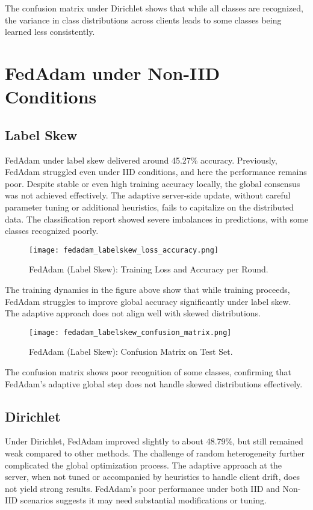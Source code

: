 \documentclass[12pt,a4paper]{report}
\begin{document}
The confusion matrix under Dirichlet shows that while all classes are recognized, the variance in class distributions across clients leads to some classes being learned less consistently.

\section{FedAdam under Non-IID Conditions}

\subsection{Label Skew}
FedAdam under label skew delivered around 45.27\% accuracy. Previously, FedAdam struggled even under IID conditions, and here the performance remains poor. Despite stable or even high training accuracy locally, the global consensus was not achieved effectively. The adaptive server-side update, without careful parameter tuning or additional heuristics, fails to capitalize on the distributed data. The classification report showed severe imbalances in predictions, with some classes recognized poorly.

\begin{figure}[H]
	\centering
	\texttt{[image: fedadam\_labelskew\_loss\_accuracy.png]}
	\caption{FedAdam (Label Skew): Training Loss and Accuracy per Round.}
\end{figure}

The training dynamics in the figure above show that while training proceeds, FedAdam struggles to improve global accuracy significantly under label skew. The adaptive approach does not align well with skewed distributions.

\begin{figure}[H]
	\centering
	\texttt{[image: fedadam\_labelskew\_confusion\_matrix.png]}
	\caption{FedAdam (Label Skew): Confusion Matrix on Test Set.}
\end{figure}

The confusion matrix shows poor recognition of some classes, confirming that FedAdam's adaptive global step does not handle skewed distributions effectively.

\subsection{Dirichlet}
Under Dirichlet, FedAdam improved slightly to about 48.79\%, but still remained weak compared to other methods. The challenge of random heterogeneity further complicated the global optimization process. The adaptive approach at the server, when not tuned or accompanied by heuristics to handle client drift, does not yield strong results. FedAdam’s poor performance under both IID and Non-IID scenarios suggests it may need substantial modifications or tuning.
\end{document}
